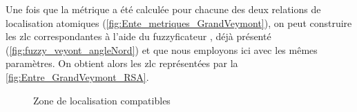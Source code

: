 Une fois que la métrique a été calculée pour chacune des deux
relations de localisation atomiques
(\autoref{fig:Ente_metriques_GrandVeymont}), on peut construire les
\ac{zlc} correspondantes à l'aide du fuzzyficateur
, déjà présenté
(\autoref{fig:fuzzy_veyont_angleNord}) et que nous employons ici avec
les mêmes paramètres. On obtient alors les \ac{zlc} représentées par
la \autoref{fig:Entre_GrandVeymont_RSA}.

\begin{figure}
  \centering
  \hspace{1cm}
  \caption{Zone de localisation compatibles}
  \label{fig:Entre_GrandVeymont_RSA}
\end{figure}

